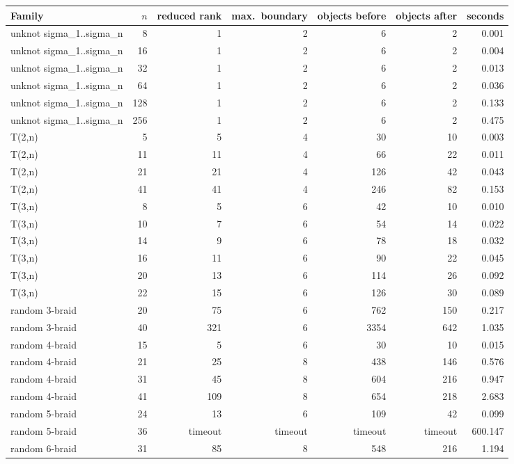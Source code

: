 \begin{tabular}{@{}lrrrrrr@{}}
\toprule
Family & $n$ & reduced rank & max.\ boundary & objects before & objects after & seconds \\
\midrule
unknot sigma\_1..sigma\_n & 8 & 1 & 2 & 6 & 2 & 0.001 \\
unknot sigma\_1..sigma\_n & 16 & 1 & 2 & 6 & 2 & 0.004 \\
unknot sigma\_1..sigma\_n & 32 & 1 & 2 & 6 & 2 & 0.013 \\
unknot sigma\_1..sigma\_n & 64 & 1 & 2 & 6 & 2 & 0.036 \\
unknot sigma\_1..sigma\_n & 128 & 1 & 2 & 6 & 2 & 0.133 \\
unknot sigma\_1..sigma\_n & 256 & 1 & 2 & 6 & 2 & 0.475 \\
T(2,n) & 5 & 5 & 4 & 30 & 10 & 0.003 \\
T(2,n) & 11 & 11 & 4 & 66 & 22 & 0.011 \\
T(2,n) & 21 & 21 & 4 & 126 & 42 & 0.043 \\
T(2,n) & 41 & 41 & 4 & 246 & 82 & 0.153 \\
T(3,n) & 8 & 5 & 6 & 42 & 10 & 0.010 \\
T(3,n) & 10 & 7 & 6 & 54 & 14 & 0.022 \\
T(3,n) & 14 & 9 & 6 & 78 & 18 & 0.032 \\
T(3,n) & 16 & 11 & 6 & 90 & 22 & 0.045 \\
T(3,n) & 20 & 13 & 6 & 114 & 26 & 0.092 \\
T(3,n) & 22 & 15 & 6 & 126 & 30 & 0.089 \\
random 3-braid & 20 & 75 & 6 & 762 & 150 & 0.217 \\
random 3-braid & 40 & 321 & 6 & 3354 & 642 & 1.035 \\
random 4-braid & 15 & 5 & 6 & 30 & 10 & 0.015 \\
random 4-braid & 21 & 25 & 8 & 438 & 146 & 0.576 \\
random 4-braid & 31 & 45 & 8 & 604 & 216 & 0.947 \\
random 4-braid & 41 & 109 & 8 & 654 & 218 & 2.683 \\
random 5-braid & 24 & 13 & 6 & 109 & 42 & 0.099 \\
random 5-braid & 36 & timeout & timeout & timeout & timeout & 600.147 \\
random 6-braid & 31 & 85 & 8 & 548 & 216 & 1.194 \\
\bottomrule
\end{tabular}
